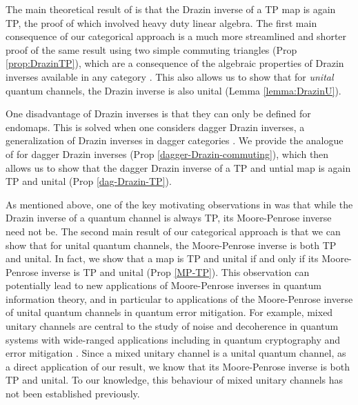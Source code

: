 \documentclass[submission,copyright,creativecommons]{eptcs}
\begin{document}
The main theoretical result of \cite{cao2021nisq} is that the Drazin inverse of a TP map is again TP, the proof \cite[App A]{cao2021nisq} of which involved  heavy duty linear algebra. The first main consequence of our categorical approach is a much more streamlined and shorter proof of the same result using two simple commuting triangles  (Prop \ref{prop:DrazinTP}), which are a consequence of the algebraic properties of Drazin inverses available in any category \cite[Prop 3.10]{cockett2024drazin}. This also allows us to show that for \textit{unital} quantum channels, the Drazin inverse is also unital (Lemma \ref{lemma:DrazinU}). 

One disadvantage of Drazin inverses is that they can only be defined for endomaps. This is solved when one considers dagger Drazin inverses, a generalization of Drazin inverses in dagger categories \cite{cockett2025dagger}. We provide the analogue of \cite[Prop 3.10]{cockett2024drazin} for dagger Drazin inverses (Prop \ref{dagger-Drazin-commuting}), which then allows us to show that the dagger Drazin inverse of a TP and untial map is again TP and unital (Prop \ref{dag-Drazin-TP}). 

As mentioned above, one of the key motivating observations in \cite{cao2021nisq} was that while the Drazin inverse of a quantum channel is always TP, its Moore-Penrose inverse need not be. The second main result of our categorical approach is that we can show that for unital quantum channels, the Moore-Penrose inverse is both TP and unital. In fact, we show that a map is TP and unital if and only if its Moore-Penrose inverse is TP and unital (Prop \ref{MP-TP}). This observation can potentially lead to new applications of Moore-Penrose inverses in quantum information theory, and in particular to applications of the Moore-Penrose inverse of unital quantum channels in quantum error mitigation. For example, mixed unitary channels are central to the study of noise and decoherence in quantum systems with wide-ranged applications including in quantum cryptography \cite{ambainis2000private,ambainis2004small,hayden2004randomizing} and error mitigation \cite{TuJ25}. Since a mixed unitary channel is a unital quantum channel, as a direct application of our result, we know that its Moore-Penrose inverse is both TP and unital. To our knowledge, this behaviour of mixed unitary channels has not been established previously. 
\end{document}
